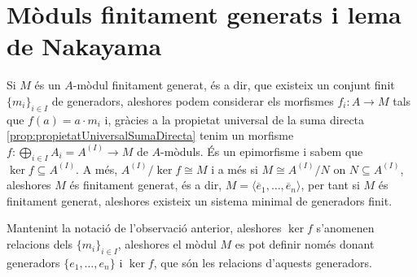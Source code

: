 \documentclass[../../../main.tex]{subfiles}
\begin{document}
\section{Mòduls finitament generats i lema de Nakayama}

Si $M$ és un $A$-mòdul finitament generat, és a dir, que existeix un conjunt finit $\{m_i\}_{i\in I}$ de generadors, aleshores podem considerar els morfismes $f_i:A\to M$ tals que $f(a) = a\cdotp m_i$ i, gràcies a la propietat universal de la suma directa \ref{prop:propietatUniversalSumaDirecta} tenim un morfisme $f:\bigoplus_{i\in I}A_i = A^{(I)}\to M$ de $A$-mòduls. És un epimorfisme i sabem que $\ker f\subseteq A^{(I)}$. A més, $A^{(I)}/\ker f\cong M$ i a més si $M\cong A^{(I)}/N$ on $N\subseteq A^{(I)}$, aleshores $M$ és finitament generat, és a dir, $M = \langle \overline{e}_1,\ldots,\overline{e}_n\rangle$, per tant si $M$ és finitament generat, aleshores existeix un sistema minimal de generadors finit.

\begin{defi}
Mantenint la notació de l'observació anterior, aleshores $\ker f$ s'anomenen relacions dels $\{m_i\}_{i\in I}$, aleshores el mòdul $M$ es pot definir només donant generadors $\{e_1,\ldots,e_n\}$ i $\ker f$, que són les relacions d'aquests generadors. 
\end{defi}
\end{document}
